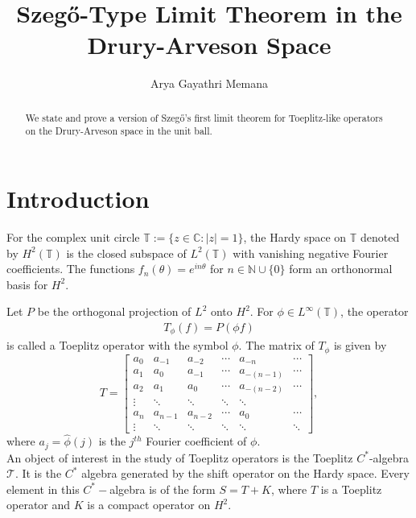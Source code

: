 \documentclass[article]{amsart}
\title{Szeg\H{o}-Type Limit Theorem in the Drury-Arveson Space}
\author{Arya Gayathri Memana}
\begin{document}
\maketitle
\begin{abstract}
   We state and prove a version of Szeg\H{o}'s first limit theorem for Toeplitz-like operators on the Drury-Arveson space in the unit ball.
\end{abstract}

\section{Introduction}

For the complex unit circle $\mathbb{T}:= \{z \in \mathbb{C}: |z|=1\}$, the Hardy space on $\mathbb{T}$ denoted by $H^2(\mathbb{T})$ is the closed subspace of $L^2(\mathbb{T})$ with vanishing negative Fourier coefficients. The functions  $f_n(\theta) = e^{i n \theta}$ for $n \in \mathbb{N} \cup \{0\}$ form an orthonormal basis for $H^2$.

Let $P$ be the orthogonal projection of $L^2$ onto $H^2$. For $\phi \in L^{\infty}(\mathbb{T})$, the operator 
\begin{align*}
    T_{\phi}(f) = P(\phi f)
\end{align*}
is called a Toeplitz operator with the symbol $\phi$. The matrix of $T_{\phi}$ is given by
 \[
T = \begin{bmatrix}
a_0 & a_{-1} & a_{-2} & \cdots & a_{-n} & \cdots \\
a_1 & a_0 & a_{-1} & \cdots & a_{-(n-1)} & \cdots \\
a_2 & a_1 & a_0 & \cdots & a_{-(n-2)} & \cdots \\
\vdots & \ddots & \ddots & \ddots & \ddots & \\
a_n & a_{n-1} & a_{n-2} & \cdots & a_0 & \cdots \\
\vdots & \ddots & \ddots & \ddots & \ddots & \ddots
\end{bmatrix},
\]
  where $a_j=\hat{\phi}(j)$ is the $j^{th}$ Fourier coefficient of $\phi$.\\
  
An object of interest in the study of Toeplitz operators is the Toeplitz $C^*$-algebra $\mathcal{T}$. It is the $C^*$ algebra generated by the shift operator on the Hardy space. Every element in this $C^*-$algebra is of the form $S= T+K$, where $T$ is a Toeplitz operator and $K$ is a compact operator on $H^2$.\\
\end{document}
